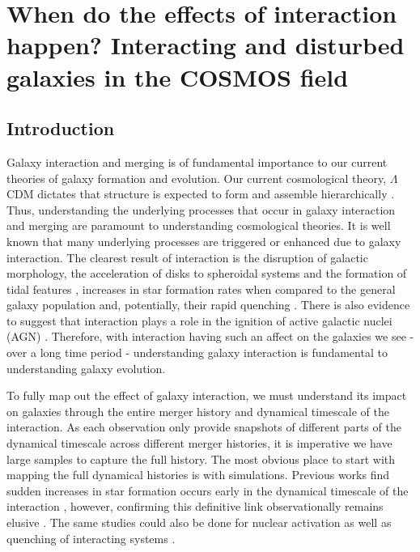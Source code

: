 \chapter{When do the effects of interaction happen? Interacting and disturbed galaxies in the COSMOS field}
\section{Introduction}\label{introduction}
\noindent Galaxy interaction and merging is of fundamental importance to our current theories of galaxy formation and evolution. Our current cosmological theory, $\Lambda$CDM dictates that structure is expected to form and assemble hierarchically \citep{1978MNRAS.183..341W, 2001MNRAS.328..726S, 2013MNRAS.436.1765M}. Thus, understanding the underlying processes that occur in galaxy interaction and merging are paramount to understanding cosmological theories. It is well known that many underlying processes are triggered or enhanced due to galaxy interaction. The clearest result of interaction is the disruption of galactic morphology, the acceleration of disks to spheroidal systems and the formation of tidal features \citep{1972ApJ...178..623T, 1977ApJ...212..616T, 2005MNRAS.357..753G, 2009MNRAS.397..802H}, increases in star formation rates when compared to the general galaxy population \citep{1991ApJ...370L..65B, 2006ApJ...652...56B, 2014MNRAS.437.2137S, 2015ApJ...807L..16K} and, potentially, their rapid quenching \citep{2013MNRAS.430.1901H, 2023RAA....23i5026D}. There is also evidence to suggest that interaction plays a role in the ignition of active galactic nuclei (AGN) \citep{2011MNRAS.418.2043E, 2015ApJ...806..219C, 2023MNRAS.523.4164H}. Therefore, with interaction having such an affect on the galaxies we see - over a long time period - understanding galaxy interaction is fundamental to understanding galaxy evolution.

To fully map out the effect of galaxy interaction, we must understand its impact on galaxies through the entire merger history and dynamical timescale of the interaction. As each observation only provide snapshots of different parts of the dynamical timescale across different merger histories, it is imperative we have large samples to capture the full history. The most obvious place to start with mapping the full dynamical histories is with simulations. Previous works find sudden increases in star formation occurs early in the dynamical timescale of the interaction \citep{2008MNRAS.384..386C, 2019MNRAS.490.2139R}, however, confirming this definitive link observationally remains elusive \citep{2023ApJ...958...96R}. The same studies could also be done for nuclear activation as well as quenching of interacting systems \citep{2011MNRAS.418.2043E, 2018PASJ...70S..37G, 2023ApJ...942..107S}. 

